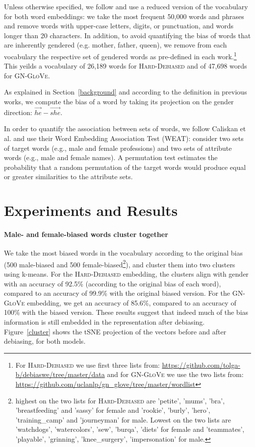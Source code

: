 \documentclass[11pt,a4paper]{article}
\begin{document}
	Unless otherwise specified, we follow \citet{BCZ16} and use a reduced version of the vocabulary for both word embeddings: we take the most frequent 50,000 words and phrases and remove words with upper-case letters, digits, or punctuation, and words longer than 20 characters. In addition, to avoid quantifying the bias of words that are inherently gendered (e.g. mother, father, queen), we remove from each vocabulary the respective set of gendered words as pre-defined in each work.\footnote{For \textsc{Hard-Debiased} we use first three lists from: \url{https://github.com/tolga-b/debiaswe/tree/master/data} and for \textsc{GN-GloVe} we use the two lists from: \url{https://github.com/uclanlp/gn_glove/tree/master/wordlist}} This yeilds a vocabulary of 26,189 words for \textsc{Hard-Debiased} and of 47,698 words for \textsc{GN-GloVe}.
	
	As explained in Section~\ref{background} and according to the definition in previous works, we compute the bias of a word by taking its projection on the gender direction: $\overrightarrow{he} - \overrightarrow{she}$.
	
	In order to quantify the association between sets of words, we follow Caliskan et al. \citeyearpar{CBN17} and use their Word Embedding Association Test (WEAT): consider two sets of target words (e.g., male and female professions) and two sets of attribute words (e.g., male and female names). A permutation test estimates the probability that a random permutation of the target words would produce equal or greater similarities to the attribute sets. 		
	
	\section{Experiments and Results}
	
	\paragraph{Male- and female-biased words cluster together}
	We take the most biased words in the vocabulary according to the original bias (500 male-biased and 500 female-biased\footnote{highest on the two lists for \textsc{Hard-Debiased} are 'petite', 'mums', 'bra', 'breastfeeding' and 'sassy' for female and 'rookie', 'burly', 'hero', 'training\_camp' and 'journeyman' for male. Lowest on the two lists are 'watchdogs', 'watercolors', 'sew', 'burqa', 'diets' for female and 'teammates', 'playable', 'grinning', 'knee\_surgery', 'impersonation' for male.}), and cluster them into two clusters using k-means. For the \textsc{Hard-Debiased} embedding, the clusters align with gender with an accuracy of 92.5\% (according to the original bias of each word), compared to an accuracy of 99.9\% with the original biased version. For the \textsc{GN-GloVe} embedding, we get an accuracy of 85.6\%, compared to an accuracy of 100\% with the biased version. These results suggest that indeed much of the bias information is still embedded in the representation after debiasing. Figure~\ref{cluster} shows the tSNE \cite{MH08} projection of the vectors before and after debiasing, for both models. 
	
\end{document}
